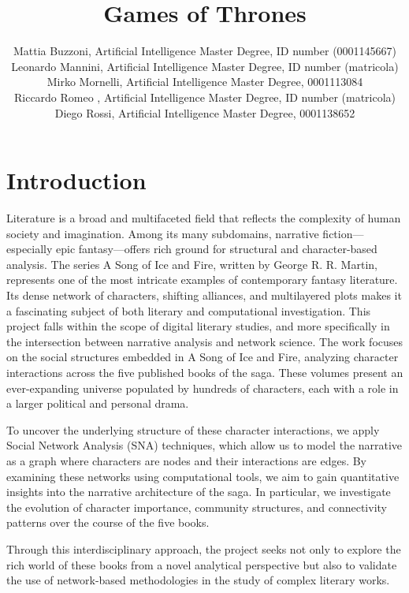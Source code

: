 \documentclass[12pt, a4paper]{article}
\author{Mattia Buzzoni, Artificial Intelligence Master Degree, ID number (0001145667)
\\Leonardo Mannini, Artificial Intelligence Master Degree, ID number (matricola)
\\ Mirko Mornelli, Artificial Intelligence Master Degree, 0001113084
\\Riccardo Romeo , Artificial Intelligence Master Degree, ID number (matricola)
\\Diego Rossi, Artificial Intelligence Master Degree, 0001138652}
\date{}
\title{Games of Thrones}
\begin{document}
\maketitle

\section{Introduction}
\label{introduction}
\begin{comment}
(The history of the 5 books)
The context includes: the general field (e.g., literature, history,
archaeology, tourism, biology, forensics, religious studies); the
specific application (e.g., literary analysis, quantitative history,
genetics, virology, forensics intelligence, tourism planning, biblical
quantitative studies).
\end{comment}
Literature is a broad and multifaceted field that reflects the complexity of human society and imagination. Among its many subdomains, narrative fiction—especially epic fantasy—offers rich ground for structural and character-based analysis. The series A Song of Ice and Fire, written by George R. R. Martin, represents one of the most intricate examples of contemporary fantasy literature. Its dense network of characters, shifting alliances, and multilayered plots makes it a fascinating subject of both literary and computational investigation. 
This project falls within the scope of digital literary studies, and more specifically in the intersection between narrative analysis and network science. The work focuses on the social structures embedded in A Song of Ice and Fire, analyzing character interactions across the five published books of the saga. These volumes present an ever-expanding universe populated by hundreds of characters, each with a role in a larger political and personal drama.

To uncover the underlying structure of these character interactions, we apply Social Network Analysis (SNA) techniques, which allow us to model the narrative as a graph where characters are nodes and their interactions are edges. By examining these networks using computational tools, we aim to gain quantitative insights into the narrative architecture of the saga. In particular, we investigate the evolution of character importance, community structures, and connectivity patterns over the course of the five books.

Through this interdisciplinary approach, the project seeks not only to explore the rich world of these books from a novel analytical perspective but also to validate the use of network-based methodologies in the study of complex literary works.
\end{document}
